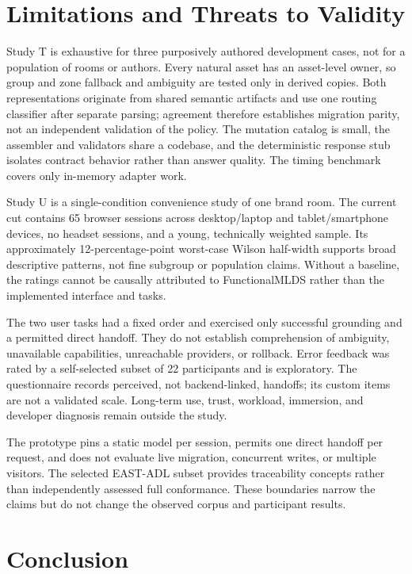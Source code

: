 \section{Limitations and Threats to Validity}
\label{sec:limitations}

Study T is exhaustive for three purposively authored development cases, not for
a population of rooms or authors.  Every natural asset has an asset-level
owner, so group and zone fallback and ambiguity are tested only in derived
copies.  Both representations originate from shared semantic artifacts and
use one routing classifier after separate parsing; agreement therefore
establishes migration parity, not an independent validation of the policy.
The mutation catalog is small, the assembler and validators share a codebase,
and the deterministic response stub isolates contract behavior rather than
answer quality.  The timing benchmark covers only in-memory adapter work.

Study U is a single-condition convenience study of one brand room.  The current
cut contains 65 browser sessions across desktop/laptop and tablet/smartphone
devices, no headset sessions, and a young, technically weighted sample.  Its
approximately 12-percentage-point worst-case Wilson half-width supports broad
descriptive patterns, not fine subgroup or population claims.  Without a
baseline, the ratings cannot be causally attributed to FunctionalMLDS rather
than the implemented interface and tasks.

The two user tasks had a fixed order and exercised only successful grounding
and a permitted direct handoff.  They do not establish comprehension of
ambiguity, unavailable capabilities, unreachable providers, or rollback.
Error feedback was rated by a self-selected subset of 22 participants and is
exploratory.  The questionnaire records perceived, not backend-linked,
handoffs; its custom items are not a validated scale.  Long-term use, trust,
workload, immersion, and developer diagnosis remain outside the study.

The prototype pins a static model per session, permits one direct handoff per
request, and does not evaluate live migration, concurrent writes, or multiple
visitors.  The selected EAST-ADL subset provides traceability concepts rather
than independently assessed full conformance.  These boundaries narrow the
claims but do not change the observed corpus and participant results.

\section{Conclusion}
\label{sec:conclusion}


